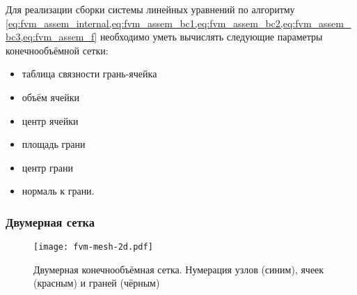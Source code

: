 Для реализации сборки системы линейных уравнений по 
алгоритму \cref{eq:fvm_assem_internal,eq:fvm_assem_bc1,eq:fvm_assem_bc2,eq:fvm_assem_bc3,eq:fvm_assem_f}
необходимо уметь вычислять следующие параметры конечнообъёмной сетки:
\begin{itemize}
\item
таблица связности грань-ячейка
\item
объём ячейки
\item
центр ячейки
\item
площадь грани
\item
центр грани
\item
нормаль к грани.
\end{itemize}

\subsubsection{Двумерная сетка}

\begin{figure}[h!]
\centering
\texttt{[image: fvm-mesh-2d.pdf]}
\caption{Двумерная конечнообъёмная сетка. Нумерация узлов (синим), ячеек (красным) и граней (чёрным)}
\label{fig:fvm-mesh-2d}
\end{figure}

